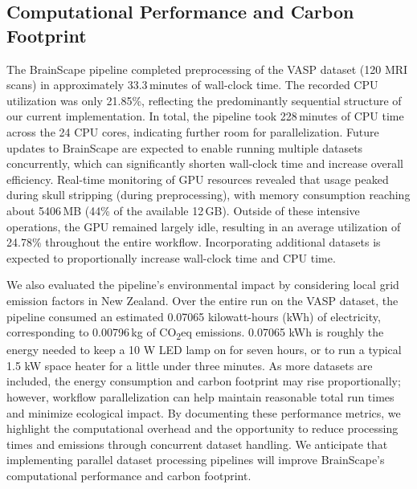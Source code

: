 \subsection{Computational Performance and Carbon Footprint}

The BrainScape pipeline completed preprocessing of the VASP dataset (120 MRI scans) in approximately 33.3\,minutes of wall-clock time. 
The recorded CPU utilization was only 21.85\%, reflecting the predominantly sequential structure of our current implementation. 
In total, the pipeline took 228\,minutes of CPU time across the 24 CPU cores, indicating further room for parallelization. 
Future updates to BrainScape are expected to enable running multiple datasets concurrently, 
which can significantly shorten wall-clock time and increase overall efficiency.
Real-time monitoring of GPU resources revealed that usage peaked during skull stripping (during preprocessing), 
with memory consumption reaching about 5406\,MB (44\% of the available 12\,GB). 
Outside of these intensive operations, the GPU remained largely idle, resulting in an average utilization 
of 24.78\% throughout the entire workflow. 
Incorporating additional datasets is expected to proportionally increase wall-clock time and CPU time.

We also evaluated the pipeline's environmental impact by considering local grid emission factors in New Zealand. 
Over the entire run on the VASP dataset, the pipeline consumed an estimated 0.07065 kilowatt-hours (kWh) of electricity, corresponding to 
0.00796\,kg of CO\textsubscript{2}eq emissions. 
0.07065 kWh is roughly the energy needed to keep a 10 W LED lamp on for seven hours, 
or to run a typical 1.5 kW space heater for a little under three minutes.
As more datasets are included, the energy consumption and 
carbon footprint may rise proportionally; however, workflow parallelization can help maintain 
reasonable total run times and minimize ecological impact. By documenting these performance metrics, we highlight 
the computational overhead and the opportunity to reduce processing times and emissions through concurrent dataset handling. 
We anticipate that implementing parallel dataset processing pipelines will improve BrainScape's computational performance and carbon footprint.


